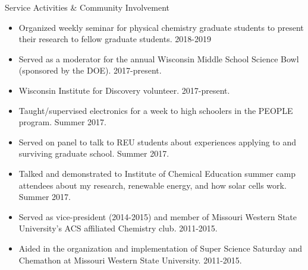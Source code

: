 \documentclass{resume} %
\begin{document}
\begin{rSection}{Service Activities \& Community Involvement}

\begin{itemize}[leftmargin = 0 pt]
	\item Organized weekly seminar for physical chemistry graduate students to present their research to fellow graduate students. 2018-2019
	\item Served as a moderator for the annual Wisconsin Middle School Science Bowl (sponsored by the DOE). 2017-present.
	\item Wisconsin Institute for Discovery volunteer. 2017-present. 
	\item Taught/supervised electronics for a week to high schoolers in the PEOPLE program. Summer 2017.
	\item Served on panel to talk to REU students about experiences applying to and surviving graduate school. Summer 2017.
	\item Talked and demonstrated to Institute of Chemical Education summer camp attendees about my research, renewable energy, and how solar cells work. Summer 2017.  
	\item Served as vice-president (2014-2015) and member of Missouri Western State University's ACS affiliated Chemistry club. 2011-2015.
	\item Aided in the organization and implementation of Super Science Saturday and Chemathon at Missouri Western State University. 2011-2015.	
\end{itemize}

\end{rSection}

\end{document}
